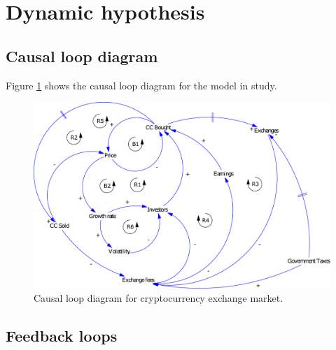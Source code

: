 \section{Dynamic hypothesis}
\subsection{Causal loop diagram}
Figure \ref{img:causalloop} shows the causal loop diagram for the model in study.
\begin{figure}[H]
	\centering
    \includegraphics[scale=0.75]{files/CausalLoopDiagram.pdf}
    \caption{Causal loop diagram for cryptocurrency exchange market.}
    \label{img:causalloop}
\end{figure}

\subsection{Feedback loops}
